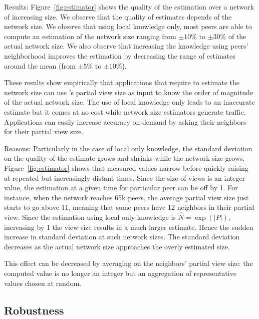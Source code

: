 \begin{asparadesc}
\item [Results:] Figure~\ref{fig:estimator} shows the quality of the estimation
  over a network of increasing size. We observe that the quality of estimates
  depends of the network size. We observe that using local knowledge only, most
  peers are able to compute an estimation of the network size ranging from
  $\pm 10\%$ to $\pm 30\%$ of the actual network size. We also observe that
  increasing the knowledge using peers' neighborhood improves the estimation by
  decreasing the range of estimates around the mean (from $\pm 5\%$ to
  $\pm 10\%$).

  These results show empirically that applications that require to estimate the
  network size can use \SPRAY's partial view size as input to know the order of
  magnitude of the actual network size. The use of local knowledge only leads to
  an inaccurate estimate but it comes at no cost while network size estimators
  generate traffic. Applications can easily increase accuracy on-demand by
  asking their neighbors for their partial view size.

\item [Reasons:] Particularly in the case of local only knowledge, the standard
  deviation on the quality of the estimate grows and shrinks while the network
  size grows. Figure~\ref{fig:estimator} shows that measured values narrow
  before quickly raising at repeated but increasingly distant times.  Since the
  size of views is an integer value, the estimation at a given time for
  particular peer can be off by 1.  For instance, when the network reaches 65k
  peers, the average partial view size just starts to go above 11, meaning that
  some peers have 12 neighbors in their partial view. Since the estimation using
  local only knowledge is $\widehat{N} = \exp(|P|)$, increasing by 1 the view
  size results in a much larger estimate. Hence the sudden increase in standard
  deviation at such network sizes. The standard deviation decreases as the
  actual network size approaches the overly estimated size.
 
  This effect can be decreased by averaging on the neighbors' partial view size:
  the computed value is no longer an integer but an aggregation of
  representative values chosen at random.
\end{asparadesc}

\subsection{Robustness}

